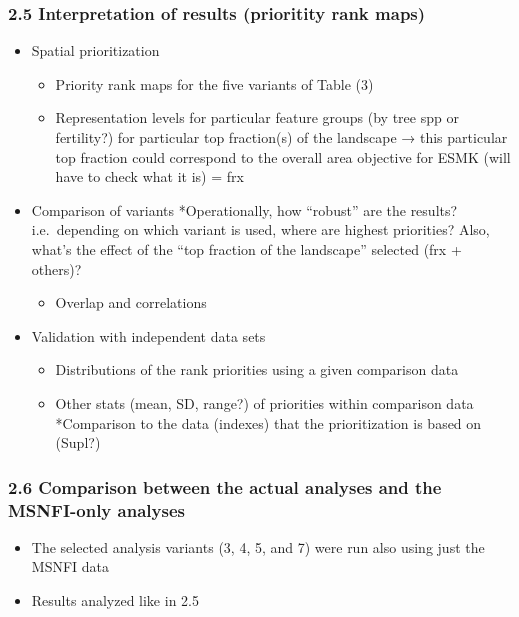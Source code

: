 \documentclass[]{article}
\begin{document}
\subsubsection{2.5 Interpretation of results (prioritity rank maps)}

\begin{itemize}
\itemsep1pt\parskip0pt
\item
  Spatial prioritization

  \begin{itemize}
  \itemsep1pt\parskip0pt
  \item
    Priority rank maps for the five variants of Table (3)
  \item
    Representation levels for particular feature groups (by tree spp or
    fertility?) for particular top fraction(s) of the landscape → this
    particular top fraction could correspond to the overall area
    objective for ESMK (will have to check what it is) = frx
  \end{itemize}
\item
  Comparison of variants *Operationally, how ``robust'' are the results?
  i.e.~depending on which variant is used, where are highest priorities?
  Also, what's the effect of the ``top fraction of the landscape''
  selected (frx + others)?

  \begin{itemize}
  \itemsep1pt\parskip0pt
  \item
    Overlap and correlations
  \end{itemize}
\item
  Validation with independent data sets

  \begin{itemize}
  \itemsep1pt\parskip0pt
  \item
    Distributions of the rank priorities using a given comparison data
  \item
    Other stats (mean, SD, range?) of priorities within comparison data
    *Comparison to the data (indexes) that the prioritization is based
    on (Supl?)
  \end{itemize}
\end{itemize}

\subsubsection{2.6 Comparison between the actual analyses and the
MSNFI-only analyses}

\begin{itemize}
\itemsep1pt\parskip0pt
\item
  The selected analysis variants (3, 4, 5, and 7) were run also using
  just the MSNFI data
\item
  Results analyzed like in 2.5
\end{itemize}
\end{document}
